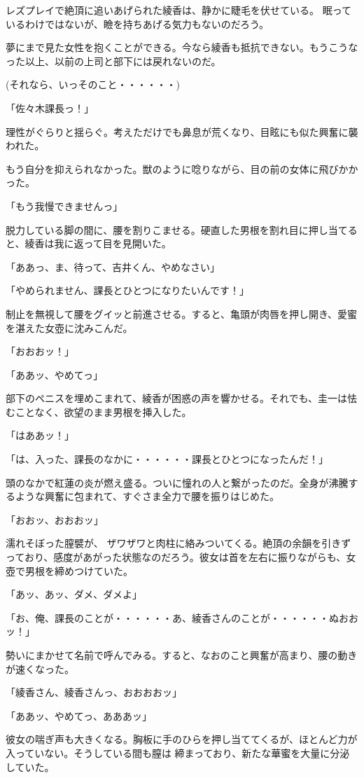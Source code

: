 ﻿\documentclass[book,tate]{jlreq}
\begin{document}
レズプレイで絶頂に追いあげられた綾香は、静かに睫毛を伏せている。 眠っているわけではないが、瞼を持ちあげる気力もないのだろう。

夢にまで見た女性を抱くことができる。今なら綾香も抵抗できない。もうこうなった以上、以前の上司と部下には戻れないのだ。

(それなら、いっそのこと・・・・・・)

「佐々木課長っ！」

理性がぐらりと揺らぐ。考えただけでも鼻息が荒くなり、目眩にも似た興奮に襲われた。

もう自分を抑えられなかった。獣のように唸りながら、目の前の女体に飛びかかった。

「もう我慢できませんっ」

脱力している脚の間に、腰を割りこませる。硬直した男根を割れ目に押し当てると、綾香は我に返って目を見開いた。

「ああっ、ま、待って、吉井くん、やめなさい」

「やめられません、課長とひとつになりたいんです！」

制止を無視して腰をグイッと前進させる。すると、亀頭が肉唇を押し開き、愛蜜を湛えた女壺に沈みこんだ。

「おおおッ！」

「ああッ、やめてっ」

部下のペニスを埋めこまれて、綾香が困惑の声を響かせる。それでも、圭一は怯むことなく、欲望のまま男根を挿入した。

「はああッ！」

「は、入った、課長のなかに・・・・・・課長とひとつになったんだ！」

頭のなかで紅蓮の炎が燃え盛る。ついに憧れの人と繋がったのだ。全身が沸騰するような興奮に包まれて、すぐさま全力で腰を振りはじめた。

「おおッ、おおおッ」

濡れそぼった膣襞が、 ザワザワと肉柱に絡みついてくる。絶頂の余韻を引きずっており、感度があがった状態なのだろう。彼女は首を左右に振りながらも、女壺で男根を締めつけていた。

「あッ、あッ、ダメ、ダメよ」

「お、俺、課長のことが・・・・・・あ、綾香さんのことが・・・・・・ぬおおッ！」

勢いにまかせて名前で呼んでみる。すると、なおのこと興奮が高まり、腰の動きが速くなった。

「綾香さん、綾香さんっ、おおおおッ」

「ああッ、やめてっ、あああッ」

彼女の喘ぎ声も大きくなる。胸板に手のひらを押し当ててくるが、ほとんど力が入っていない。そうしている間も膣は 締まっており、新たな華蜜を大量に分泌していた。
\end{document}

